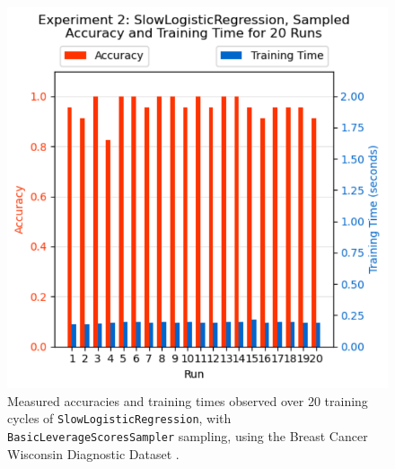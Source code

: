 \documentclass{article}
\theoremstyle{plain}
\theoremstyle{definition}
\theoremstyle{remark}
\begin{document}
\begin{figure}[ht]
\vskip 0.2in
\begin{center}
\centerline{\includegraphics[width=\columnwidth]{experiment_2a}}
\caption{Measured accuracies and training times observed over 20 training cycles of \texttt{SlowLogisticRegression}, with \texttt{BasicLeverageScoresSampler} sampling, using the Breast Cancer Wisconsin Diagnostic Dataset \cite{breastcancer}.}
\label{experiment_1a}
\end{center}
\vskip -0.2in
\end{figure}
\end{document}
